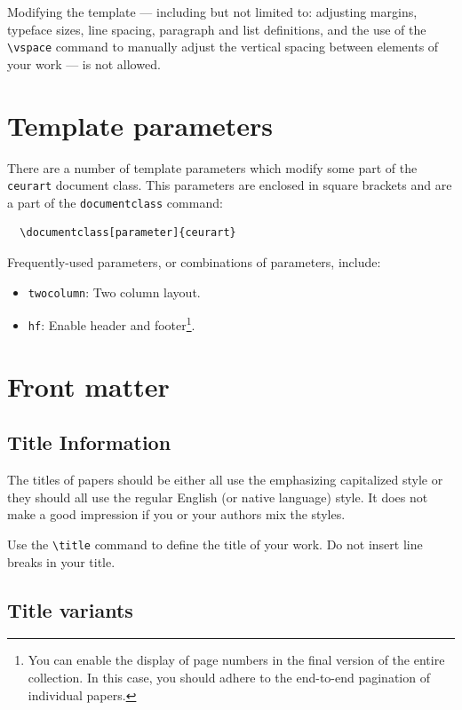 \documentclass[
]{ceurart}
\begin{document}
Modifying the template --- including but not limited to: adjusting
margins, typeface sizes, line spacing, paragraph and list definitions,
and the use of the \verb|\vspace| command to manually adjust the
vertical spacing between elements of your work --- is not allowed.

\section{Template parameters}

There are a number of template
parameters which modify some part of the \verb|ceurart| document class.
This parameters are enclosed in square
brackets and are a part of the {\verb|documentclass|} command:
\begin{verbatim}
  \documentclass[parameter]{ceurart}
\end{verbatim}

Frequently-used parameters, or combinations of parameters, include:
\begin{itemize}
\item {\verb|twocolumn|}: Two column layout.
\item {\verb|hf|}: Enable header and footer\footnote{You can enable
    the display of page numbers in the final version of the entire
    collection. In this case, you should adhere to the end-to-end
    pagination of individual papers.}.
\end{itemize}

\section{Front matter}

\subsection{Title Information}

The titles of papers should be either all use the emphasizing
capitalized style or they should all use the regular English (or
native language) style. It does not make a good impression if you or
your authors mix the styles.

Use the \verb|\title| command to define the title of your work. Do not
insert line breaks in your title.

\subsection{Title variants}
\end{document}
